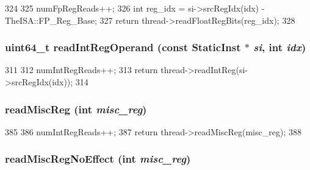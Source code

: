\begin{DoxyCode}
324     {
325         numFpRegReads++;
326         int reg_idx = si->srcRegIdx(idx) - TheISA::FP_Reg_Base;
327         return thread->readFloatRegBits(reg_idx);
328     }
\end{DoxyCode}
\hypertarget{classBaseSimpleCPU_a9e7b0a4d5373c48902425c9456b19e7e}{
\subsubsection[{readIntRegOperand}]{\setlength{\rightskip}{0pt plus 5cm}uint64\_\-t readIntRegOperand (const {\bf StaticInst} $\ast$ {\em si}, \/  int {\em idx})}}
\label{classBaseSimpleCPU_a9e7b0a4d5373c48902425c9456b19e7e}



\begin{DoxyCode}
311     {
312         numIntRegReads++;
313         return thread->readIntReg(si->srcRegIdx(idx));
314     }
\end{DoxyCode}
\hypertarget{classBaseSimpleCPU_a5a8c6c487e8da143d26188258b04f1cc}{
\subsubsection[{readMiscReg}]{ readMiscReg (int {\em misc\_\-reg})}}
\label{classBaseSimpleCPU_a5a8c6c487e8da143d26188258b04f1cc}



\begin{DoxyCode}
385     {
386         numIntRegReads++;
387         return thread->readMiscReg(misc_reg);
388     }
\end{DoxyCode}
\hypertarget{classBaseSimpleCPU_a7b5ac6af9c2c19d7c1b442b8a3aebbc6}{
\subsubsection[{readMiscRegNoEffect}]{ readMiscRegNoEffect (int {\em misc\_\-reg})}}
\label{classBaseSimpleCPU_a7b5ac6af9c2c19d7c1b442b8a3aebbc6}



